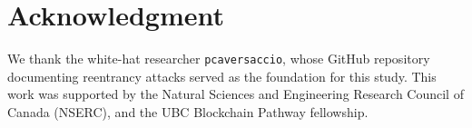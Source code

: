 \section*{Acknowledgment}

We thank the white-hat researcher \texttt{pcaversaccio}, whose GitHub repository documenting reentrancy attacks served as the foundation for this study. This work was supported by the Natural Sciences and Engineering Research Council of Canada (NSERC), and the UBC Blockchain Pathway fellowship.